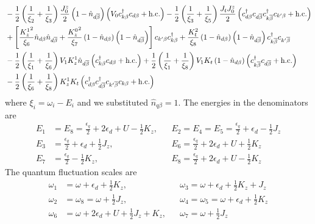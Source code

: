 \documentclass[12pt,twoside]{report}
\numberwithin{equation}{section}
\begin{document}
\begin{equation}
\begin{aligned}
&- \frac{1}{2}\left(\frac{1}{\xi_2} + \frac{1}{\xi_3}\right)\frac{J^z_0}{2}\left(1 - \hat n_{d\overline\beta}\right)\left(V_0 c^\dagger_{k\beta}c_{d\beta} + \text{h.c.}\right) - \frac{1}{2}\left(\frac{1}{\xi_3} + \frac{1}{\xi_5}\right)\frac{J_t J^z_0}{2}\left(c^\dagger_{d\beta}c_{d\overline\beta}c^\dagger_{k\overline\beta}c_{k^\prime\beta} + \text{h.c.}\right) \\
&+ \left[\frac{{K_z^1}^2}{\xi_6}\hat n_{d\beta}\hat n_{d\overline\beta} + \frac{{K_z^0}^2}{\xi_7}\left(1 - \hat n_{d\beta}\right)\left(1 - \hat n_{d\overline\beta}\right)\right]c_{k^\prime\beta}c^\dagger_{k\beta} + \frac{K_t^2}{\xi_8}\left(1 - \hat n_{d\beta}\right)\left(1 - \hat n_{d\overline\beta}\right)c^\dagger_{k\overline\beta}c_{k^\prime\overline\beta}\\
&- \frac{1}{2}\left(\frac{1}{\xi_1} + \frac{1}{\xi_6} \right)V_1 K_z^1 \hat n_{d\overline\beta}\left(c^\dagger_{k\beta}c_{d\beta} + \text{h.c.}\right) + \frac{1}{2}\left(\frac{1}{\xi_1} + \frac{1}{\xi_8} \right)V_1 K_t \left(1 - \hat n_{d\beta}\right)\left(c^\dagger_{k\overline\beta}c_{d\overline\beta} + \text{h.c.}\right)\\
&- \frac{1}{2}\left(\frac{1}{\xi_6} + \frac{1}{\xi_8} \right)K_z^1 K_t \left(c^\dagger_{d\beta}c^\dagger_{d\overline\beta}c_{k^\prime\overline\beta}c_{k\beta} + \text{h.c.}\right)
\end{aligned}\end{equation}
where \(\xi_i = \omega_i - E_i\) and we substituted \(\hat n_{q\beta}=1\). The energies in the denominators are
\begin{equation}\begin{aligned}
E_1&= E_8 = \frac{\epsilon_q}{2} + 2\epsilon_d+ U - \frac{1}{2}K_z, &&E_2 = E_4 = E_5 = \frac{\epsilon_q}{2} + \epsilon_d - \frac{1}{2}J_z\\
E_3&=\frac{\epsilon_q}{2} + \epsilon_d + \frac{1}{2}J_z, &&E_6 =\frac{\epsilon_q}{2} + 2\epsilon_d+ U + \frac{1}{2}K_z\\
E_7&=\frac{\epsilon_q}{2} - \frac{1}{2}K_z, &&E_8=\frac{\epsilon_q}{2}+2\epsilon_d+ U  - \frac{1}{2}K_z
\end{aligned}\end{equation}
The quantum fluctuation scales are
\begin{equation}\begin{aligned}
\omega_1&=\omega + \epsilon_d+\frac{1}{2}K_z, &&\omega_3 =\omega+\epsilon_d + \frac{1}{2}K_z + J_z\\
\omega_2& = \omega_8 = \omega+\frac{1}{2}J_z, &&\omega_4 = \omega_5 = \omega + \epsilon_d + \frac{1}{2}K_z\\
\omega_6&=\omega+2\epsilon_d+U+\frac{1}{2}J_z + K_z, &&\omega_7 =\omega+\frac{1}{2}J_z\\
\end{aligned}\end{equation}
\end{document}
